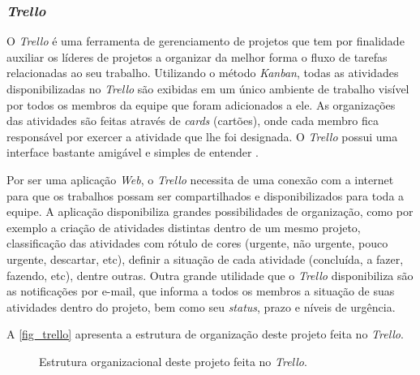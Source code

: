 \subsubsection{\textit{Trello}}

O \textit{Trello} é uma ferramenta de gerenciamento de projetos que tem por finalidade auxiliar os líderes de projetos a organizar da melhor forma o fluxo de tarefas relacionadas ao seu trabalho. Utilizando o método \textit{Kanban}, todas as atividades disponibilizadas no \textit{Trello} são exibidas em um único ambiente de trabalho visível por todos os membros da equipe que foram adicionados a ele. As organizações das atividades são feitas através de \textit{cards} (cartões), onde cada membro fica responsável por exercer a atividade que lhe foi designada. O \textit{Trello } possui uma interface bastante amigável e simples de entender \cite{TRELLO2017}. 

Por ser uma aplicação \textit{Web}, o \textit{Trello} necessita de uma conexão com a internet para que os trabalhos possam ser compartilhados e disponibilizados para toda a equipe. A aplicação disponibiliza grandes possibilidades de organização, como por exemplo a criação de atividades distintas dentro de um mesmo projeto, classificação das atividades com rótulo de cores (urgente, não urgente, pouco urgente, descartar, etc), definir a situação de cada atividade (concluída, a fazer, fazendo, etc), dentre outras. Outra grande utilidade que o \textit{Trello} disponibiliza são as notificações por e-mail, que informa a todos os membros a situação de suas atividades dentro do projeto, bem como seu \textit{status}, prazo e níveis de urgência.

A \autoref{fig_trello} apresenta a estrutura de organização deste projeto feita no \textit{Trello}.

\begin{figure}[h]
	\caption{\label{fig_trello}Estrutura organizacional deste projeto feita no \textit{Trello}.}
	\begin{center}
	\end{center}
	\centering {}
\end{figure}